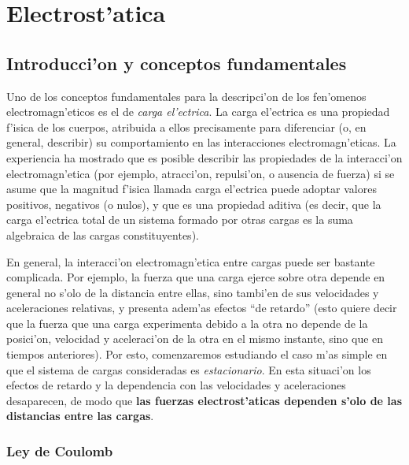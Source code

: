 \chapter{Electrost'atica}
\setcounter{page}{1}

\section{Introducci'on y conceptos fundamentales}

Uno de los conceptos fundamentales para la descripci'on de los
fen'omenos electromagn'eticos es el de \textit{carga el'ectrica}.
La carga el'ectrica es una propiedad f'isica de los cuerpos,
atribuida a ellos precisamente para diferenciar (o, en general,
describir) su comportamiento en las interacciones
electromagn'eticas. La experiencia ha mostrado que es posible
describir las propiedades de la interacci'on
electromagn'etica (por ejemplo, atracci'on, repulsi'on, o ausencia de fuerza) si
se asume que la magnitud f'isica llamada carga el'ectrica puede
adoptar valores positivos, negativos (o nulos), y que es una
propiedad aditiva (es decir, que la carga el'ectrica total de un
sistema formado por otras cargas es la suma algebraica de las
cargas constituyentes).

En general, la interacci'on electromagn'etica entre cargas puede ser bastante complicada. Por ejemplo, la fuerza que una carga ejerce sobre otra depende en general no s'olo de la distancia entre ellas, sino tambi'en de sus velocidades y aceleraciones relativas, y presenta adem'as efectos ``de retardo'' (esto quiere decir que la fuerza que una carga experimenta debido a la otra no depende de la posici'on, velocidad y aceleraci'on de la otra en el mismo instante, sino que en tiempos anteriores). Por esto, comenzaremos estudiando el caso m'as simple en que el sistema de cargas consideradas es \textit{estacionario}. En esta situaci'on los efectos de retardo y la dependencia con las velocidades y aceleraciones desaparecen, de modo que \textbf{las fuerzas electrost'aticas dependen s'olo de las distancias entre las cargas}.


\subsection{Ley de Coulomb}

